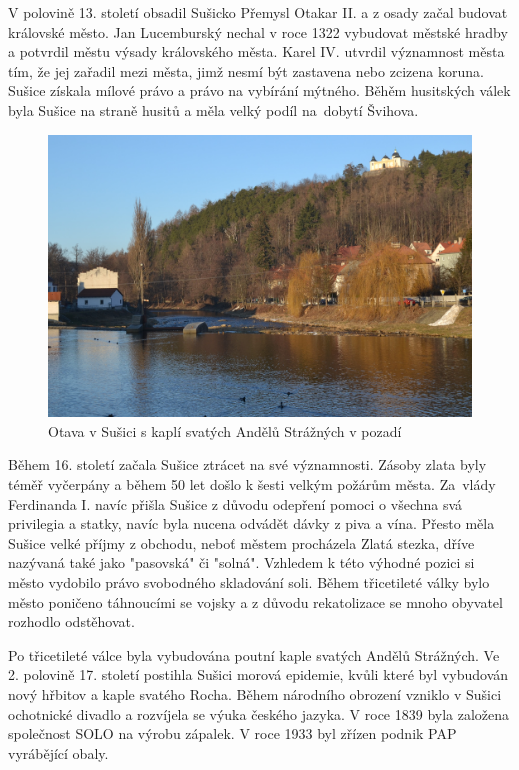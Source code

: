 \documentclass[thesis=M,czech]{FITthesis}[2012/06/26]
\begin{document}
V polovině 13. století obsadil Sušicko Přemysl Otakar II. a z osady začal budovat královské město. Jan Lucemburský nechal v roce 1322 vybudovat městské hradby a potvrdil městu výsady královského města. Karel IV. utvrdil významnost města tím, že jej zařadil mezi města, jimž nesmí být zastavena nebo zcizena koruna. Sušice získala mílové právo a právo na vybírání mýtného. Běhěm husitských válek byla Sušice na straně husitů a měla velký podíl na~dobytí Švihova. 

\begin{figure}[h!]
	\centering
	\includegraphics[width=12cm]{pics/susice.jpg}
	\caption{Otava v Sušici s kaplí svatých Andělů Strážných v pozadí}
	\label{obrazek:susice}
\end{figure}

Během 16. století začala Sušice ztrácet na své významnosti. Zásoby zlata byly téměř vyčerpány a během 50 let došlo k šesti velkým požárům města. Za~vlády Ferdinanda I. navíc přišla Sušice z důvodu odepření pomoci o všechna svá privilegia a statky, navíc byla nucena odvádět dávky z piva a vína. Přesto měla Sušice velké příjmy z obchodu, neboť městem procházela Zlatá stezka, dříve nazývaná také jako "pasovská" či "solná". Vzhledem k této výhodné pozici si město vydobilo právo svobodného skladování soli. Během třicetileté války bylo město poničeno táhnoucími se vojsky a z důvodu rekatolizace se mnoho obyvatel rozhodlo odstěhovat. 

Po třicetileté válce byla vybudována poutní kaple svatých Andělů Strážných. Ve 2. polovině 17. století postihla Sušici morová epidemie, kvůli které byl vybudován nový hřbitov a kaple svatého Rocha. Během národního obrození vzniklo v Sušici ochotnické divadlo a rozvíjela se výuka českého jazyka. V roce 1839 byla založena společnost SOLO na výrobu zápalek. V roce 1933 byl zřízen podnik PAP vyrábějící obaly. 
\end{document}
